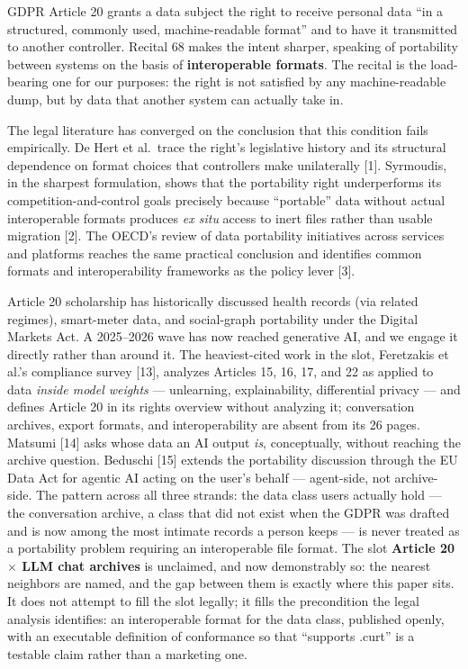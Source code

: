 \documentclass[11pt]{article}
\begin{document}
GDPR Article 20 grants a data subject the right to receive personal data ``in a structured, commonly used, machine-readable format'' and to have it transmitted to another controller. Recital 68 makes the intent sharper, speaking of portability between systems on the basis of \textbf{interoperable formats}. The recital is the load-bearing one for our purposes: the right is not satisfied by any machine-readable dump, but by data that another system can actually take in.

The legal literature has converged on the conclusion that this condition fails empirically. De Hert et al.\ trace the right's legislative history and its structural dependence on format choices that controllers make unilaterally [1]. Syrmoudis, in the sharpest formulation, shows that the portability right underperforms its competition-and-control goals precisely because ``portable'' data without actual interoperable formats produces \emph{ex situ} access to inert files rather than usable migration [2]. The OECD's review of data portability initiatives across services and platforms reaches the same practical conclusion and identifies common formats and interoperability frameworks as the policy lever [3].

Article 20 scholarship has historically discussed health records (via related regimes), smart-meter data, and social-graph portability under the Digital Markets Act. A 2025--2026 wave has now reached generative AI, and we engage it directly rather than around it. The heaviest-cited work in the slot, Feretzakis et al.'s compliance survey [13], analyzes Articles 15, 16, 17, and 22 as applied to data \emph{inside model weights} --- unlearning, explainability, differential privacy --- and defines Article 20 in its rights overview without analyzing it; conversation archives, export formats, and interoperability are absent from its 26 pages. Matsumi [14] asks whose data an AI output \emph{is}, conceptually, without reaching the archive question. Beduschi [15] extends the portability discussion through the EU Data Act for agentic AI acting on the user's behalf --- agent-side, not archive-side. The pattern across all three strands: the data class users actually hold --- the conversation archive, a class that did not exist when the GDPR was drafted and is now among the most intimate records a person keeps --- is never treated as a portability problem requiring an interoperable file format. The slot \textbf{Article 20 $\times$ LLM chat archives} is unclaimed, and now demonstrably so: the nearest neighbors are named, and the gap between them is exactly where this paper sits. It does not attempt to fill the slot legally; it fills the precondition the legal analysis identifies: an interoperable format for the data class, published openly, with an executable definition of conformance so that ``supports .curt'' is a testable claim rather than a marketing one.
\end{document}
